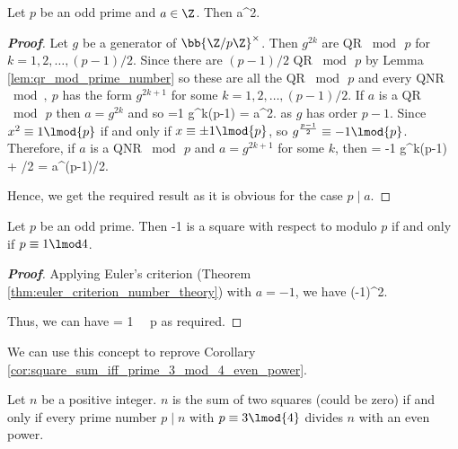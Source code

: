 \begin{theorem}\label{thm:euler_criterion_number_theory}
Let $p$ be an odd prime and $a\in \Z$. Then
\be
{} \equiv a^{2}.
\ee
\end{theorem}

\begin{proof}[\bf Proof]
Let $g$ be a generator of $\bb{\Z/p\Z}^\times$. Then $g^{2k}$ are QR $\bmod\, p$ for $k=1,2,\dots, (p-1)/2$. Since there are $(p-1)/2$ QR $\bmod\, p$ by Lemma \ref{lem:qr_mod_prime_number} so these are all the QR $\bmod\, p$ and every QNR $\bmod,\ p$ has the form $g^{2k+1}$ for some $k=1,2,\dots,(p-1)/2$. If $a$ is a QR $\bmod\, p$ then $a = g^{2k}$ and so 
\be
{} =1 \equiv g^{k(p-1)} = a^{2}.
\ee
as $g$ has order $p-1$. Since $x^2 \equiv 1\lmod{p}$ if and only if $x\equiv \pm 1\lmod{p}$, so $g^{\frac {p-1}2} \equiv -1 \lmod{p}$. Therefore, if $a$ is a QNR $\bmod\, p$ and $a = g^{2k+1}$ for some $k$, then
\be
{} = -1 \equiv g^{k(p-1) + /2} = a^{(p-1)/2}.
\ee

Hence, we get the required result as it is obvious for the case $p\mid a$.
\end{proof}

\begin{corollary}\label{cor:minus_1_is_qr_iff_prime_1_mod_4}
Let $p$ be an odd prime. Then -1 is a square with respect to modulo $p$ if and only if $p\equiv 1\lmod 4$.
\end{corollary}

\begin{proof}[\bf Proof]
Applying Euler's criterion (Theorem \ref{thm:euler_criterion_number_theory}) with $a = -1$, we have
\be
{} \equiv (-1)^{2}.
\ee

Thus, we can have
\be
{} = 1 \ \lra\ p 
\ee
as required.
\end{proof}


We can use this concept to reprove Corollary \ref{cor:square_sum_iff_prime_3_mod_4_even_power}.

\begin{theorem}
Let $n$ be a positive integer. $n$ is the sum of two squares (could be zero) if and only if every prime number $p\mid n$ with $p\equiv 3\lmod{4}$ divides $n$ with an even power.
\end{theorem}

